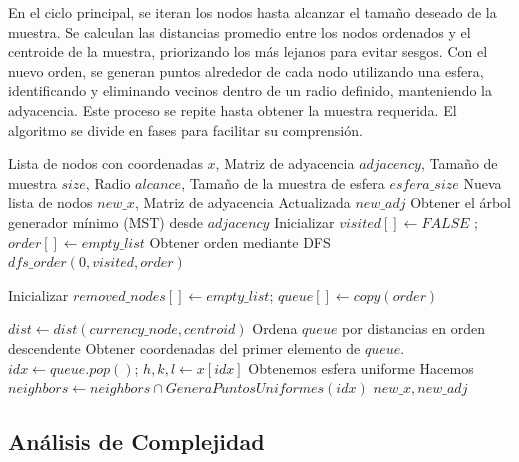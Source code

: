 En el ciclo principal, se iteran los nodos hasta alcanzar el tamaño deseado de la muestra. Se calculan las distancias promedio entre los nodos ordenados y el centroide de la muestra, priorizando los más lejanos para evitar sesgos. Con el nuevo orden, se generan puntos alrededor de cada nodo utilizando una esfera, identificando y eliminando vecinos dentro de un radio definido, manteniendo la adyacencia. Este proceso se repite hasta obtener la muestra requerida. El algoritmo se divide en fases para facilitar su comprensión. 
\begin{algorithm}[H]
\caption{Método General}
\label{alg:metodoGeneral}
\begin{algorithmic}[1]
\Require Lista de nodos con coordenadas $x$, Matriz de adyacencia $adjacency$, Tamaño de muestra $size$, Radio $alcance$, Tamaño de la muestra de esfera $esfera\_size$
\Ensure Nueva lista de nodos $new\_x$, Matriz de adyacencia Actualizada $new\_adj$
\Statex
{}
    \State Obtener el árbol generador mínimo (MST) desde $adjacency$ 
    \State Inicializar $visited[] \gets FALSE$ ; $order[] \gets empty\_list$
    \State Obtener orden mediante DFS $dfs\_order(0, visited, order) $ 

    \State Inicializar $removed\_nodes[] \gets empty\_list$; $queue[] \gets copy(order)$
    
            \State $dist \gets dist(currency\_node,centroid) $
            \State Ordena $queue$ por distancias en orden descendente
        \EndIf
        \State Obtener coordenadas del primer elemento de $queue$.
        \\ \hfil $idx \gets queue.pop()$; $h, k, l \gets x[idx]$ 
        \State Obtenemos esfera uniforme  
        \State Hacemos $neighbors \gets neighbors \cap GeneraPuntosUniformes(idx)$
            \State {} 
        \EndFor
    \EndWhile
    \State \Return $new\_x, new\_adj$
\EndFunction
\end{algorithmic}
\end{algorithm}
\subsection{Análisis de Complejidad}

